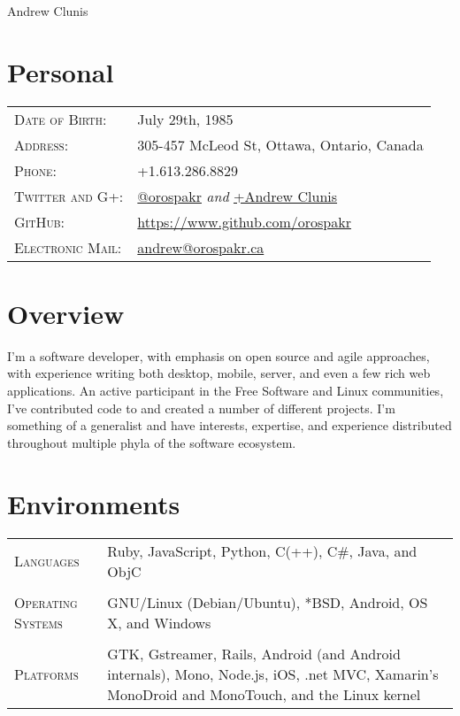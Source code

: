 \documentclass[letterpaper,10pt]{article}
\begin{document}
\pagestyle{empty} %

\par{\centering
{\Huge Andrew \textsc Clunis
}\bigskip\par}

\section{Personal}
\begin{longtable}{p{3cm}|p{12cm}}
  \textsc{Date of Birth:} & July 29th, 1985 \\
  \textsc{Address:} & 305-457 McLeod St, Ottawa, Ontario, Canada \\
  \textsc{Phone:} & +1.613.286.8829 \\
  \textsc{Twitter and G+:} & \href{http://twitter.com/orospakr}{@orospakr} \emph{and} \href{https://plus.google.com/101728978406554574081}{+Andrew Clunis}\\
  \textsc{GitHub:} & \href{https://github.com/orospakr}{https://www.github.com/orospakr} \\
  \textsc{Electronic Mail:} & \href{mailto:andrew@orospakr.ca}{andrew@orospakr.ca} \\
\end{longtable}

\section{Overview}
I'm a software developer, with emphasis on open source and agile
approaches, with experience writing both desktop, mobile, server, and
even a few rich web applications.  An active participant in the Free
Software and Linux communities, I've contributed code to and created a
number of different projects.  I'm something of a generalist and have
interests, expertise, and experience distributed throughout multiple
phyla of the software ecosystem.

\section{Environments}
\begin{longtable}{p{3cm}|p{12cm}}
  \textsc{Languages} & Ruby, JavaScript, Python, C(++), C\#, Java, and ObjC \\
  \multicolumn{2}{c}{} \\
  \textsc{Operating Systems} & GNU/Linux (Debian/Ubuntu), *BSD, Android, OS X, and Windows\\
  \multicolumn{2}{c}{} \\
  \textsc{Platforms} & GTK, Gstreamer, Rails, Android (and Android internals), Mono, Node.js, iOS, .net MVC, Xamarin's MonoDroid and MonoTouch, and the Linux kernel
\end{longtable}
\end{document}
